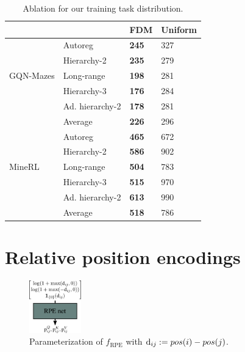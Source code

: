 \begin{table}[t]
    \centering
    \small
    \caption{Ablation for our training task distribution.}
    \label{tab:fdm-task-dist-ablation}
    \begin{tabular}{l|l|ll}
    \toprule
        ~ & ~ & FDM & Uniform \\%
        \midrule
        \multirow{5}{*}{GQN-Mazes} & Autoreg & \textbf{245} & 327 \\%
        ~ & Hierarchy-2 & \textbf{235} & 279 \\%
        ~ & Long-range & \textbf{198} & 281 \\%
        ~ & Hierarchy-3 & \textbf{176} & 284 \\%
        ~ & Ad. hierarchy-2 & \textbf{178} & 281 \\%
        ~ & Average & \textbf{226} & 296 \\%
        \midrule
        ~ & Autoreg & \textbf{465} & 672 \\%
        ~ & Hierarchy-2 & \textbf{586} & 902 \\%
        MineRL & Long-range & \textbf{504} & 783 \\%
        ~ & Hierarchy-3 & \textbf{515} & 970 \\%
        ~ & Ad. hierarchy-2 & \textbf{613} & 990 \\%
        ~ & Average & \textbf{518} & 786 \\%
        \bottomrule
    \end{tabular}
\end{table}


\section{Relative position encodings} \label{app:fdm-rpe}

\begin{figure}
  \begin{center}
    \includegraphics[width=0.2\textwidth]{figs/fdm/rpe-net.pdf}
  \end{center}
  \caption{Parameterization of $f_\text{RPE}$ with ${\textnormal{d}}_{ij} := pos(i)-pos(j)$.}
  \label{fig:fdm-rpe-net}
\end{figure}

